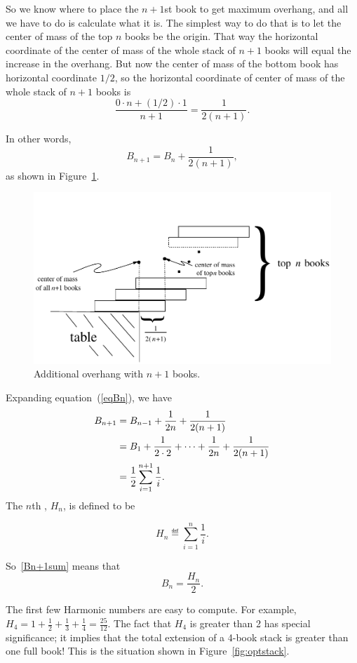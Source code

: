 So we know where to place the $n+1$st book to get maximum overhang, and
all we have to do is calculate what it is.  The simplest way to do that is
to let the center of mass of the top $n$ books be the origin.  That way
the horizontal coordinate of the center of mass of the whole stack of
$n+1$ books will equal the increase in the overhang.  But now the
center of mass of the bottom book has horizontal coordinate $1/2$, so the
horizontal coordinate of center of mass of the whole stack of $n+1$ books is
\[
\frac{0 \cdot n + (1/2) \cdot 1}{n+1} = \frac{1}{2(n +1)}.
\]

In other words, 
\begin{equation}\label{eqBn}
    B_{n+1} = B_n + \frac{1}{2(n+1)},
\end{equation}
as shown in Figure~\ref{Bn1}.

\begin{figure}
\centerline{\includegraphics[width=.80\textwidth]{figures/bookstack-5}}
\caption{Additional overhang with $n+1$ books.}
\label{Bn1}
\end{figure}

Expanding equation~(\ref{eqBn}), we have
\begin{align}
B_{n+1} & = B_{n-1} + \frac{1}{2n} + \frac{1}{2(n+1)}\notag\\
        & = B_1 + \frac{1}{2 \cdot 2} + \cdots + \frac{1}{2n} +
            \frac{1}{2(n+1)}\notag\\
        & = \frac{1}{2}\sum_{i=1}^{n+1} \frac{1}{i}.\label{Bn+1sum}
\end{align}
The $n$th , $H_n$, is defined to be
\begin{definition}
\[
H_n \eqdef \sum_{i=1}^n \frac{1}{i}.
\]
\end{definition}
So~\eqref{Bn+1sum} means that
\[
B_n = \frac{H_n}{2}.
\]

The first few Harmonic numbers are easy to compute.  For example, $H_4 = 1
+ \frac{1}{2} + \frac{1}{3} + \frac{1}{4} = \frac{25}{12}$.  The fact that
$H_4$ is greater than 2 has special significance; it implies that the
total extension of a 4-book stack is greater than one full book!  This is
the situation shown in Figure~\ref{fig:optstack}.

